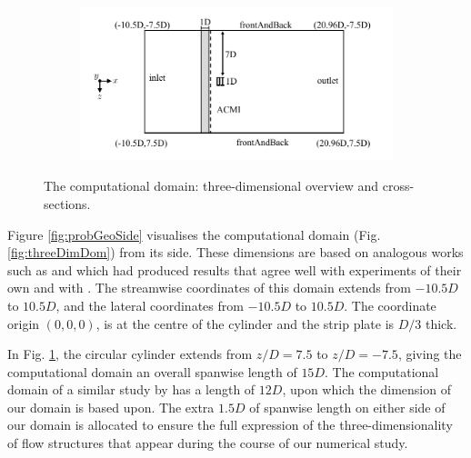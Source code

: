 \documentclass[oneside]{utmthesis}
\let\cite\citep
\begin{document}
\begin{figure} \continuedfloat
  \centering
  \begin{subfigure}[h]{0.98\textwidth}
    \includegraphics[width=\textwidth]{figs/problemGeometryTop}
    \caption{}
    \label{fig:probGeoTop}
  \end{subfigure}

  \caption{The computational domain: three-dimensional overview and cross-sections.} \label{fig:problemGeometry}
\end{figure}

Figure \ref{fig:probGeoSide} visualises the computational domain (Fig. \ref{fig:threeDimDom}) from its side. These dimensions are based on analogous works such as \cite{Maruai2017} and \cite{Maruai2018} which had produced results that agree well with experiments of their own and with \citet{Kawabata2013}. The streamwise coordinates of this domain extends from $-10.5D$ to $10.5D$, and the lateral coordinates from $-10.5D$ to $10.5D$. The coordinate origin $(0,0,0)$, is at the centre of the cylinder and the strip plate is $D/3$ thick.

In Fig. \ref{fig:probGeoTop}, the circular cylinder extends from $z/D=7.5$ to $z/D=-7.5$, giving the computational domain an overall spanwise length of $15D$. The computational domain of a similar study by \citet{Deng2007} has a length of $12D$, upon which the dimension of our domain is based upon. The extra $1.5D$ of spanwise length on either side of our domain is allocated to ensure the full expression of the three-dimensionality of flow structures that appear during the course of our numerical study.
\end{document}
